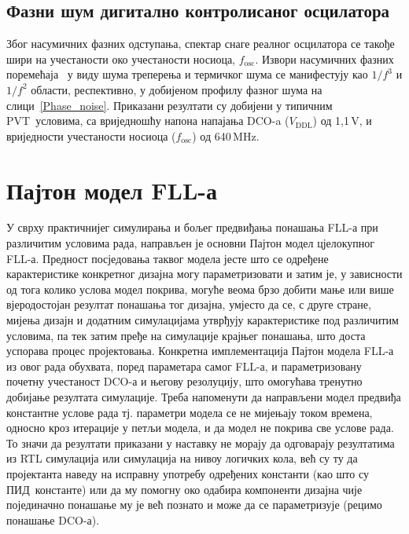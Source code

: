 \documentclass[master]{finthesis}
\def \FLL  {FLL} %
\def \DCO  {DCO} %
\def \PID  {ПИД} %
\def \PVT  {PVT} %
\begin{document}
\subsection{Фазни шум дигитално контролисаног осцилатора}
Због насумичних фазних одступања, спектар снаге реалног осцилатора се такође шири на учестаности око учестаности носиоца, $f_\text{osc}$. Извори насумичних фазних поремећаја~\cite{Milovanovic:8190103} у виду шума треперења и термичког шума се манифестују као $1/f^3$ и $1/f^2$ области, респективно, у добијеном профилу фазног шума на слици~\ref{Phase_noise}. Приказани резултати су добијени у типичним \PVT\ условима, са вриједношћу напона напајања \DCO-a ($V_\text{DDL}$) од 1,1\,V, и вриједности учестаности носиоца ($f_\text{osc}$) од 640\,MHz.


\section{Пајтон модел \FLL-а} \label{section:python_model}
У сврху практичнијег симулирања и бољег предвиђања понашања \FLL-а при различитим условима рада, направљен је основни Пајтон модел цјелокупног \FLL-а. Предност посједовања таквог модела јесте што се одређене карактеристике конкретног дизајна могу параметризовати и затим је, у зависности од тога колико услова модел покрива, могуће веома брзо добити мање или више вјеродостојан резултат понашања тог дизајна, умјесто да се, с друге стране, мијења дизајн и додатним симулацијама утврђују карактеристике под различитим условима, па тек затим пређе на симулације крајњег понашања, што доста успорава процес пројектовања. Конкретна имплементација Пајтон модела \FLL-а из овог рада обухвата, поред параметара самог \FLL-а, и параметризовану почетну учестаност \DCO-а и његову резолуцију, што омогућава тренутно добијање резултата симулације. Треба напоменути да направљени модел предвиђа константне услове рада тј. параметри модела се не мијењају током времена, односно кроз итерације у петљи модела, и да модел не покрива све услове рада. То значи да резултати приказани у наставку не морају да одговарају резултатима из RTL симулација или симулација на нивоу логичких кола, већ су ту да пројектанта наведу на исправну употребу одређених константи (као што су \PID\ константе) или да му помогну око одабира компоненти дизајна чије појединачно понашање му је већ познато и може да се параметризује (рецимо понашање \DCO-а). \par
\end{document}
